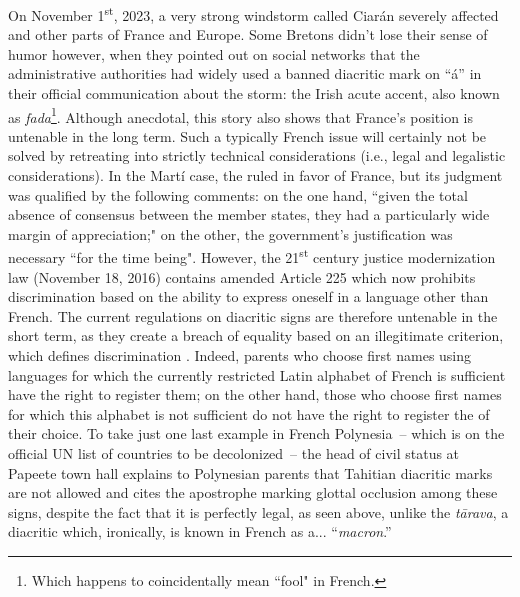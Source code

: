 \documentclass[output=paper,colorlinks,citecolor=brown]{langscibook}
\begin{document}
On November 1\textsuperscript{st}, 2023, a very strong windstorm called Ciarán severely affected  and other parts of France and Europe. Some Bretons didn't lose their sense of humor however, when they pointed out on social networks that the administrative authorities had widely used a banned diacritic mark on ``á” in their official communication about the storm: the Irish acute accent, also known as \textit{fada}\footnote{Which happens to coincidentally mean ``fool" in French.}. Although anecdotal, this story also shows that France's position is untenable in the long term. Such a typically French issue will certainly not be solved by retreating into strictly technical considerations (i.e., legal and legalistic considerations). In the Martí case, the  ruled in favor of France, but its judgment was qualified by the following comments: on the one hand, ``given the total absence of consensus between the member states, they had a particularly wide margin of appreciation;" on the other, the government's justification was necessary ``for the time being". However, the 21\textsuperscript{st} century justice modernization law (November 18, 2016) contains amended Article 225 which now prohibits discrimination based on the ability to express oneself in a language other than French. The current regulations on diacritic signs are therefore untenable in the short term, as they create a breach of equality based on an illegitimate criterion, which defines discrimination \citep{sm:Blanchet2017}. Indeed, parents who choose first names using languages for which the currently restricted Latin alphabet of French is sufficient have the right to register them; on the other hand, those who choose first names for which this alphabet is not sufficient do not have the right to register the  of their choice. To take just one last example in French Polynesia~– which is on the official UN list of countries to be decolonized~– the head of civil status at Papeete town hall explains to Polynesian parents that Tahitian diacritic marks are not allowed \citep{sm:LaDépêchedeTahiti2015} and cites the apostrophe marking glottal occlusion among these signs, despite the fact that it is perfectly legal, as seen above, unlike the \textit{tārava}, a diacritic which, ironically, is known in French as a... ``\textit{macron}.” 
\end{document}
